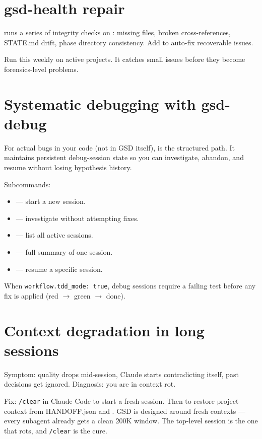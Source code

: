 \documentclass[11pt,letterpaper,openany]{book}
\begin{document}
\section{gsd-health repair}

 runs a series of integrity checks on : missing files, broken cross-references, STATE.md drift, phase directory consistency. Add  to auto-fix recoverable issues.

Run this weekly on active projects. It catches small issues before they become forensics-level problems.

\section{Systematic debugging with gsd-debug}

For actual bugs in your code (not in GSD itself),  is the structured path. It maintains persistent debug-session state so you can investigate, abandon, and resume without losing hypothesis history.

Subcommands:
\begin{itemize}[itemsep=2pt]
  \item {} --- start a new session.
  \item {} --- investigate without attempting fixes.
  \item {} --- list all active sessions.
  \item {} --- full summary of one session.
  \item {} --- resume a specific session.
\end{itemize}

When \texttt{workflow.tdd\_mode: true}, debug sessions require a failing test before any fix is applied (red $\rightarrow$ green $\rightarrow$ done).

\section{Context degradation in long sessions}

Symptom: quality drops mid-session, Claude starts contradicting itself, past decisions get ignored. Diagnosis: you are in context rot.

Fix: \texttt{/clear} in Claude Code to start a fresh session. Then  to restore project context from HANDOFF.json and . GSD is designed around fresh contexts --- every subagent already gets a clean 200K window. The top-level session is the one that rots, and \texttt{/clear} is the cure.
\end{document}
